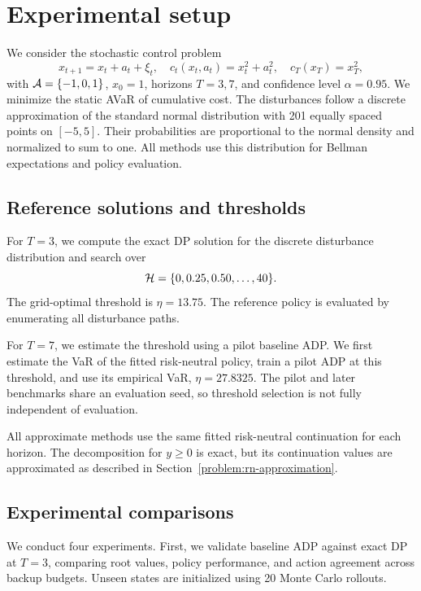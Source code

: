\section{Experimental setup}
\label{sec:experiments}

We consider the stochastic control problem
\begin{equation}
	x_{t+1}=x_t+a_t+\xi_t,
	\quad
	c_t(x_t,a_t)=x_t^2+a_t^2,
	\quad
	c_T(x_T)=x_T^2,
	\label{test-model}
\end{equation}
with $\mathcal{A}=\{-1,0,1\}$, $x_0=1$, horizons $T=3,7$, and confidence level $\alpha=0.95$. We minimize the static AVaR of cumulative cost. The disturbances follow a discrete approximation of the standard normal distribution with 201 equally spaced points on $[-5,5]$. Their probabilities are proportional to the normal density and normalized to sum to one. All methods use this distribution for Bellman expectations and policy evaluation.

\subsection{Reference solutions and thresholds}
\label{exp:references}

For $T=3$, we compute the exact DP solution for the discrete disturbance distribution and search over
\begin{equation}
	\mathcal{H}=\{0,0.25,0.50,\dots,40\}.
	\notag
	\label{test-eta-grid}
\end{equation}
The grid-optimal threshold is $\eta=13.75$. The reference policy is evaluated by enumerating all disturbance paths.

For $T=7$, we estimate the threshold using a pilot baseline ADP. We first estimate the VaR of the fitted risk-neutral policy, train a pilot ADP at this threshold, and use its empirical VaR, $\eta=27.8325$. The pilot and later benchmarks share an evaluation seed, so threshold selection is not fully independent of evaluation.

All approximate methods use the same fitted risk-neutral continuation for each horizon. The decomposition for $y\geq0$ is exact, but its continuation values are
approximated as described in Section~\ref{problem:rn-approximation}.

\subsection{Experimental comparisons}
\label{exp:comparisons}

We conduct four experiments. First, we validate baseline ADP against exact DP at $T=3$, comparing root values, policy performance, and action agreement across backup budgets. Unseen states are initialized using 20 Monte Carlo rollouts.

